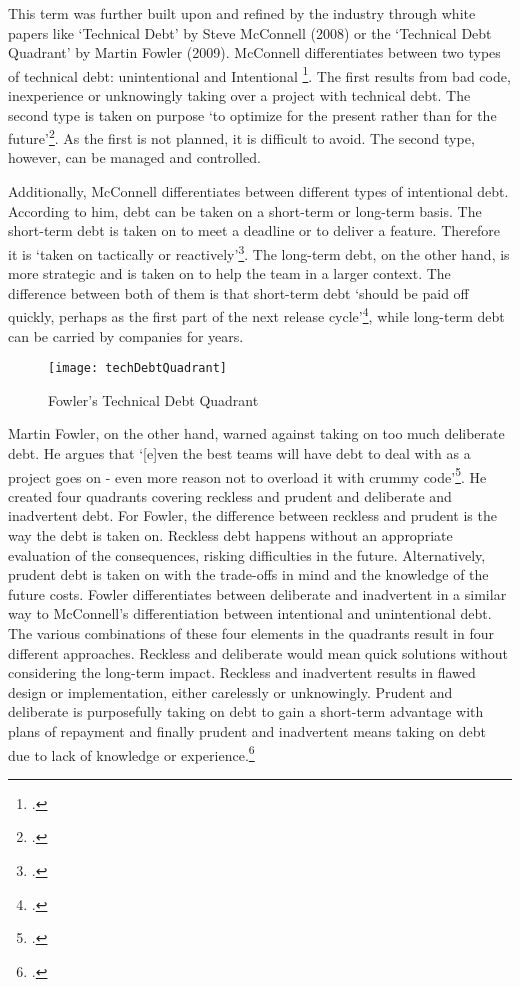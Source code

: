 This term was further built upon and refined by the industry through white papers like `Technical Debt' by Steve McConnell (2008) or the `Technical Debt Quadrant' by Martin Fowler (2009).
McConnell differentiates between two types of technical debt: unintentional and Intentional \footcite[3]{mcconnellManagingTechnicalDebt2017}. The first results from bad code, inexperience or unknowingly taking over a project with technical debt.
The second type is taken on purpose `to optimize for the present rather than for the future'\footcite[3]{mcconnellManagingTechnicalDebt2017}. As the first is not planned, it is difficult to avoid. The second type, however, can be managed and controlled.

Additionally, McConnell differentiates between different types of intentional debt. According to him, debt can be taken on a short-term or long-term basis. The short-term debt is taken on to meet a deadline or to deliver a feature. Therefore it is `taken on tactically or reactively'\footcite[3]{mcconnellManagingTechnicalDebt2017}.
The long-term debt, on the other hand, is more strategic and is taken on to help the team in a larger context. The difference between both of them is that short-term debt `should be paid off quickly, perhaps as the first part of the next release cycle'\footcite[4]{mcconnellManagingTechnicalDebt2017}, while 
long-term debt can be carried by companies for years.

\begin{figure}[H]
    \centering
    \caption{Fowler's Technical Debt Quadrant}
    \label{fig:technicaldebtquadrant}
    \texttt{[image: techDebtQuadrant]}
    \\
    \cite{fowlerTechnicalDebtQuadrant2009}
\end{figure}
Martin Fowler, on the other hand, warned against taking on too much deliberate debt. He argues that `[e]ven the best teams will have debt to deal with as a project goes on - even more reason not to overload it with crummy code'\footcite[no page number]{fowlerTechnicalDebtQuadrant2009}.
He created four quadrants covering reckless and prudent and deliberate and inadvertent debt. For Fowler, the difference between reckless and prudent is the way the debt is taken on. Reckless debt happens without an appropriate evaluation of the consequences, risking difficulties in the future. Alternatively, prudent debt is taken on
with the trade-offs in mind and the knowledge of the future costs. Fowler differentiates between deliberate and inadvertent in a similar way to McConnell's differentiation between intentional and unintentional debt.
The various combinations of these four elements in the quadrants result in four different approaches. Reckless and deliberate would mean quick solutions without considering the long-term impact. Reckless and inadvertent results in flawed design or implementation, either carelessly or unknowingly. 
Prudent and deliberate is purposefully taking on debt to gain a short-term advantage with plans of repayment and finally prudent and inadvertent means taking on debt due to lack of knowledge or experience.\footcite[no page number]{fowlerTechnicalDebtQuadrant2009}

